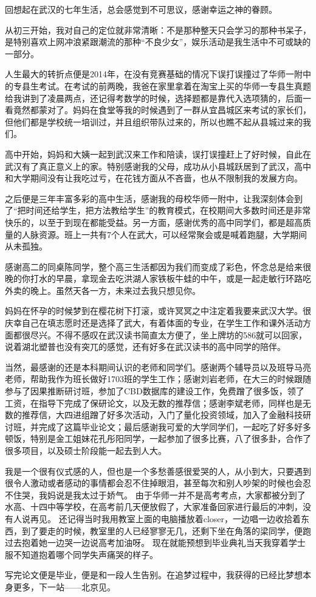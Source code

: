 
回想起在武汉的七年生活，总会感觉到不可思议，感谢幸运之神的眷顾。

从初三开始，我对自己的定位就非常清晰：不是那种整天只会学习的那种书呆子，是特别喜欢上网冲浪紧跟潮流的那种“不良少女”，娱乐活动是我生活中不可或缺的一部分。

人生最大的转折点便是2014年，在没有竞赛基础的情况下误打误撞过了华师一附中的专县生考试。在考试的前两晚，我爸在家里拿着在淘宝上买的华师一专县生真题给我讲到了凌晨两点，还记得考数学的时候，选择题都是靠代入选项猜的，后面一看竟然都蒙对了。妈妈在食堂等我的时候遇到了一群从宜昌城区来考试的家长们，但他们都是学校统一培训过，并且组织带队过来的，所以也瞧不起从县城过来的我们。

高中开始，妈妈和大姨一起到武汉来工作和陪读，误打误撞赶上了好时候，自此在武汉有了真正意义上的家。特别感谢我的父母，成功从小县城跃居到了武汉，高中和大学期间没有让我吃过亏，在花钱方面从不吝啬，也从不限制我的发展方向。

之后便是三年丰富多彩的高中生活，感谢我的母校华师一附中，让我深刻体会到了“把时间还给学生，把方法教给学生”的教育模式，在校期间大多数时间还是非常快乐的，以至于到现在都能受益。另一方面，感谢优秀的高中同学们，都是超高质量的人脉资源。班上一共有7个人在武大，可以经常聚会或是喊着跑腿，大学期间从未孤独。

感谢高二的同桌陈同学，整个高三生活都因为我们而变成了彩色，怀念总是给来很晚的你打水的早晨，拿现金去吃洪湖人家铁板牛蛙的中午，或是一起走敏行环路吃外卖的晚上。虽然天各一方，未来过去我只想见你。

妈妈在怀孕的时候梦到在樱花树下打滚，或许冥冥之中注定着我要来武汉大学。很庆幸自己在填志愿时还是选择了武大，有着体面的专业，在学生工作和课外活动方面都很尽兴。不得不感叹在武汉读书简直太方便了，坐上牌坊的586就可以回家，说着湖北塑普也没有突兀的感觉，还有好多在武汉读书的高中同学的陪伴。

当然，最感谢的还是本科期间认识的老师和同学们。感谢两个辅导员以及班导马亮老师，帮助我作为班长做好1703班的学生工作；感谢刘岩老师，在大三的时候跟随参与了因果推断研讨班，参加了CBD数据库的建设工作，免费蹭了很多饭，领了工资，在指导下完成了保研论文，以及无数的推荐信；感谢李斌老师，同样也是无数的推荐信，大四进组蹭了好多次活动，入门了量化投资领域，加入了金融科技研讨班，并完成了这篇毕业论文；最后感谢我可爱的大学同学们，一起吃了好多好多顿饭，特别是金工姐妹花孔彤阳同学，一起参加了很多比赛，八了很多卦，合作了很多项目，以及硕士阶段能一起去到人大。

我是一个很有仪式感的人，但也是一个多愁善感很爱哭的人，从小到大，只要遇到很令人激动或者感动的事情都会忍不住掉眼泪，甚至每次和别人吵架的时候也会忍不住哭，我妈说是我太过于娇气。
由于华师一并不是高考考点，大家都被分到了水高、十四中等学校，在高考前几天便放假了，大家准备回家进行最后的冲刺，没有人说再见。
还记得当时我用教室上面的电脑播放着closer，一边唱一边收拾着东西，到了要走的时候，教室里的人已经寥寥无几，还剩下坐在角落的梁同学，便跑过去抱着她一边哭一边说高考加油呀。
现在就能预想到毕业典礼当天我穿着学士服不知道抱着哪个同学失声痛哭的样子。

写完论文便是毕业，便是和一段人生告别。在追梦过程中，我获得的已经比梦想本身更多，下一站——北京见。